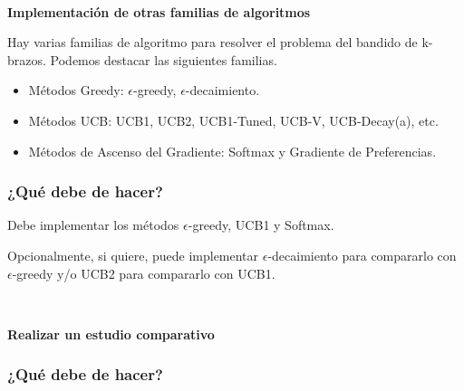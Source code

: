 \documentclass[a4paper, 11pt]{article}
\begin{document}
\

\centerline{\textbf{Implementación de otras familias de algoritmos}}

Hay varias familias de algoritmo  para resolver el problema del bandido de k-brazos. Podemos destacar las siguientes familias. 

\begin{itemize}
\item Métodos Greedy: $\epsilon$-greedy, $\epsilon$-decaimiento.
\item Métodos UCB: UCB1, UCB2, UCB1-Tuned, UCB-V, UCB-Decay(a), etc.
\item Métodos de Ascenso del Gradiente:  Softmax y Gradiente de Preferencias.
\end{itemize}



\subsubsection*{¿Qué debe de hacer?}

Debe implementar los métodos $\epsilon$-greedy, UCB1 y Softmax. 

Opcionalmente, si quiere, puede implementar $\epsilon$-decaimiento para compararlo con $\epsilon$-greedy y/o UCB2 para compararlo con UCB1.


\

\centerline{\textbf{Realizar un estudio comparativo}}

\subsubsection*{¿Qué debe de hacer?}
\end{document}
